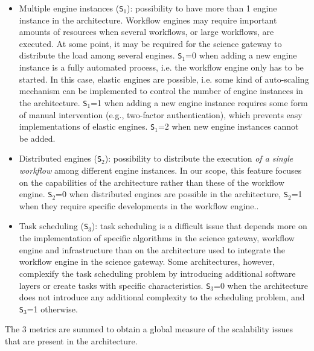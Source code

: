 \documentclass[preprint,3p,twocolumn]{elsarticle}
\newcommand{\note}[2]{\pdfmargincomment[color=yellow,author=#1,open=true]{#2}}
\newcommand{\closednote}[4]{} %
\begin{document}
\begin{itemize}[leftmargin=0cm,itemindent=0.35cm,itemsep=0cm]
\item Multiple engine instances (\texttt{S$_1$}): possibility to have
  more than 1 engine instance in the architecture. Workflow engines
  may require important amounts of resources when several workflows,
  or large workflows, are executed. At some point, it may be required
  for the science gateway to distribute the load among several
  engines. \texttt{S$_1$}=0 when adding a new engine instance is a
  fully automated process, i.e. the workflow engine only has to be
  started. In this case, elastic engines are possible, i.e. some kind
  of auto-scaling mechanism can be implemented to control the number
  of engine instances in the architecture. \texttt{S$_1$}=1 when
  adding a new engine instance requires some form of manual
  intervention (e.g., two-factor authentication), which prevents easy
  implementations of elastic engines. \texttt{S$_1$}=2 when new engine
  instances cannot be added.
\item Distributed engines (\texttt{S$_2$}): possibility to distribute
  the execution \emph{of a single workflow} among different engine
  instances. In our scope, this feature focuses on the capabilities of
  the architecture rather than these of the workflow
  engine. \texttt{S$_2$}=0 when distributed engines are possible in
  the architecture, \texttt{S$_2$}=1 when they require specific
  developments in the workflow engine..  \closednote{Rafael}{$S_2$
    would be 2 if the paradigm does not allow to distribute the
    orchestration? e.g., workflow executions implemented within MPI
    jobs, in Pegasus PMC and dispel4Py.}{Tristan}{The problem is that
    it is very difficult to define ``does not allow to''. For
    instance, why couldn't you hack Pegasus PMC so much that it
    becomes possible to distribute workflow executions in several MPI
    jobs coordinated by an MPI job? Moreover, S2=2 is not used so I'd
    prefer to leave it like this, unless you have a suggestion to
    reflect this in the text.}
\item Task scheduling (\texttt{S$_3$}): task scheduling is a difficult
  issue that depends more on the implementation of specific algorithms
  in the science gateway, workflow engine and infrastructure than on
  the architecture used to integrate the workflow engine in the
  science gateway. Some architectures, however, complexify the task
  scheduling problem by introducing additional software layers or
  create tasks with specific characteristics. \texttt{S$_3$}=0 when
  the architecture does not introduce any additional complexity to the
  scheduling problem, and \texttt{S$_3$}=1 otherwise.
\end{itemize}
The 3 metrics are summed to obtain a global measure of the scalability
issues that are present in the architecture.
\end{document}
